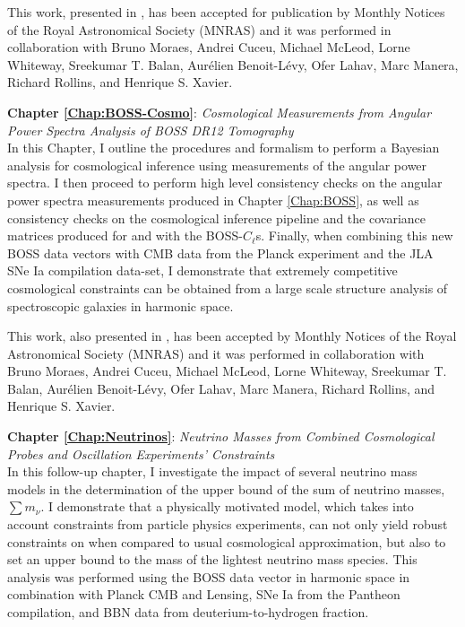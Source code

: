 \qquad This work, presented in \cite{2018LoureiroBOSS}, has been accepted for publication by Monthly Notices of the Royal Astronomical Society (MNRAS) and it was performed in collaboration with Bruno Moraes, Andrei Cuceu, Michael McLeod, Lorne Whiteway, Sreekumar T. Balan, Aur\'elien Benoit-L\'evy, Ofer Lahav, Marc Manera, Richard Rollins, and Henrique S. Xavier.

\bigskip

\textbf{Chapter \ref{Chap:BOSS-Cosmo}}: \textit{Cosmological Measurements from Angular Power Spectra Analysis of BOSS DR12 Tomography} \\[0.6em]
 In this Chapter, I outline the procedures and formalism to perform a Bayesian analysis for cosmological inference using measurements of the angular power spectra. I then proceed to perform high level consistency checks on the angular power spectra measurements produced in Chapter \ref{Chap:BOSS}, as well as consistency checks on the cosmological inference pipeline and the covariance matrices produced for and with the BOSS-$C_{\ell}$s. Finally, when combining this new BOSS data vectors with CMB data from the Planck experiment and the JLA SNe Ia compilation data-set, I demonstrate that extremely competitive cosmological constraints can be obtained from a large scale structure analysis of spectroscopic galaxies in harmonic space. 

\qquad This work, also presented in \cite{2018LoureiroBOSS}, has been accepted by Monthly Notices of the Royal Astronomical Society (MNRAS) and it was performed in collaboration with Bruno Moraes, Andrei Cuceu, Michael McLeod, Lorne Whiteway, Sreekumar T. Balan, Aur\'elien Benoit-L\'evy, Ofer Lahav, Marc Manera, Richard Rollins, and Henrique S. Xavier.

\bigskip

\textbf{Chapter \ref{Chap:Neutrinos}}: \textit{Neutrino Masses from Combined Cosmological Probes and Oscillation Experiments' Constraints} \\[0.6em]
In this follow-up chapter, I investigate the impact of several neutrino mass models in the determination of the upper bound of the sum of neutrino masses, $\sum m_{\nu}$. I demonstrate that a physically motivated model, which takes into account constraints from particle physics experiments, can not only yield robust constraints on \NM{} when compared to usual cosmological approximation, but also to set an upper bound to the mass of the lightest neutrino mass species. This analysis was performed using the BOSS data vector in harmonic space in combination with Planck CMB and Lensing, SNe Ia from the Pantheon compilation, and BBN data from deuterium-to-hydrogen fraction.

